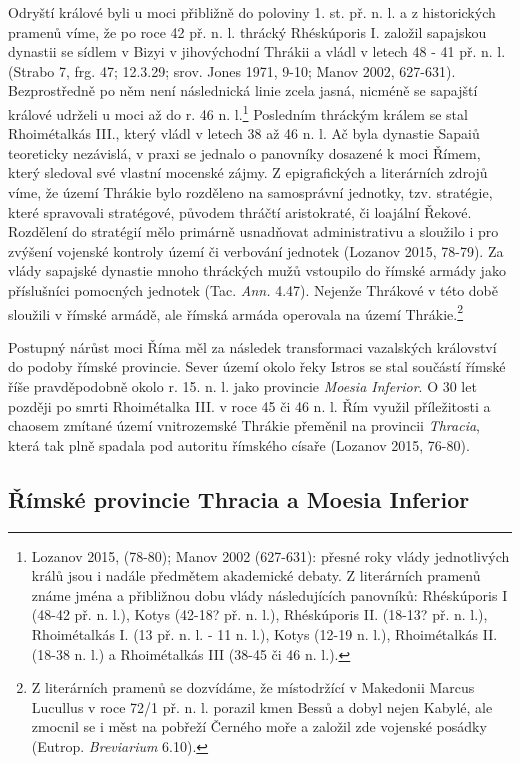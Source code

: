 Odryští králové byli u moci přibližně do poloviny 1. st. př. n. l. a z historických pramenů víme, že po roce 42 př. n. l. thrácký Rhéskúporis I. založil sapajskou dynastii se sídlem v Bizyi v jihovýchodní Thrákii a vládl v letech 48 - 41 př. n. l. (Strabo 7, frg. 47; 12.3.29; srov. Jones 1971, 9-10; Manov 2002, 627-631). Bezprostředně po něm není následnická linie zcela jasná, nicméně se sapajští králové udrželi u moci až do r. 46 n. l.\footnote{Lozanov 2015, (78-80); Manov 2002 (627-631): přesné roky vlády jednotlivých králů jsou i nadále předmětem akademické debaty. Z literárních pramenů známe jména a přibližnou dobu vlády následujících panovníků: Rhéskúporis I (48-42 př. n. l.), Kotys (42-18? př. n. l.), Rhéskúporis II. (18-13? př. n. l.), Rhoimétalkás I. (13 př. n. l. - 11 n. l.), Kotys (12-19 n. l.), Rhoimétalkás II. (18-38 n. l.) a Rhoimétalkás III (38-45 či 46 n. l.).} Posledním thráckým králem se stal Rhoimétalkás III., který vládl v letech 38 až 46 n. l. Ač byla dynastie Sapaiů teoreticky nezávislá, v praxi se jednalo o panovníky dosazené k moci Římem, který sledoval své vlastní mocenské zájmy. Z epigrafických a literárních zdrojů víme, že území Thrákie bylo rozděleno na samosprávní jednotky, tzv. stratégie, které spravovali stratégové, původem thráčtí aristokraté, či loajální Řekové. Rozdělení do stratégií mělo primárně usnadňovat administrativu a sloužilo i pro zvýšení vojenské kontroly území či verbování jednotek (Lozanov 2015, 78-79). Za vlády sapajské dynastie mnoho thráckých mužů vstoupilo do římské armády jako příslušníci pomocných jednotek (Tac. {\em Ann.} 4.47). Nejenže Thrákové v této době sloužili v římské armádě, ale římská armáda operovala na území Thrákie.\footnote{Z literárních pramenů se dozvídáme, že místodržící v Makedonii Marcus Lucullus v roce 72/1 př. n. l. porazil kmen Bessů a dobyl nejen Kabylé, ale zmocnil se i měst na pobřeží Černého moře a založil zde vojenské posádky (Eutrop. {\em Breviarium} 6.10).}

Postupný nárůst moci Říma měl za následek transformaci vazalských království do podoby římské provincie. Sever území okolo řeky Istros se stal součástí římské říše pravděpodobně okolo r. 15. n. l. jako provincie {\em Moesia Inferior}. O 30 let později po smrti Rhoimétalka III. v roce 45 či 46 n. l. Řím využil příležitosti a chaosem zmítané území vnitrozemské Thrákie přeměnil na provincii {\em Thracia}, která tak plně spadala pod autoritu římského císaře (Lozanov 2015, 76-80).

\subsection[římské-provincie-thracia-a-moesia-inferior]{Římské provincie Thracia a Moesia Inferior}

